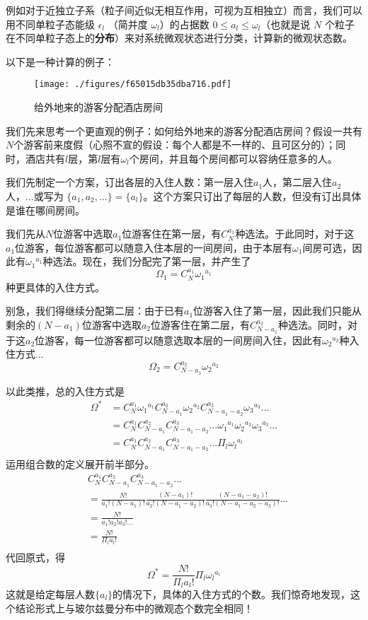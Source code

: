 例如对于近独立子系（粒子间近似无相互作用，可视为互相独立）而言，我们可以用不同单粒子态能级 $\epsilon_l$ （简并度 $\omega_l$）的占据数 $0\le a_l\le \omega_l$（也就是说 $N$ 个粒子在不同单粒子态上的\textbf{分布}）来对系统微观状态进行分类，计算新的微观状态数。

以下是一种计算的例子：
\begin{example}{}
\begin{figure}[ht]
\centering
\texttt{[image: ./figures/f65015db35dba716.pdf]}
\caption{给外地来的游客分配酒店房间} \label{fig_entro2_1}
\end{figure}
我们先来思考一个更直观的例子：如何给外地来的游客分配酒店房间？假设一共有$N$个游客前来度假（心照不宣的假设：每个人都是不一样的、且可区分的）；同时，酒店共有$l$层，第$l$层有$\omega_l$个房间，并且每个房间都可以容纳任意多的人。

我们先制定一个方案，订出各层的入住人数：第一层入住$a_1$人，第二层入住$a_2$人，...或写为 $\{a_1,a_2,...\}=\{a_l\}$。这个方案只订出了每层的人数，但没有订出具体是谁在哪间房间。

我们先从$N$位游客中选取$a_1$位游客住在第一层，有$C_N^{a_1}$种选法。于此同时，对于这$a_1$位游客，每位游客都可以随意入住本层的一间房间，由于本层有$\omega_1$间房可选，因此有${\omega_1}^{a_1}$种选法。现在，我们分配完了第一层，并产生了$$\Omega_1 = C_N^{a_1} {\omega_1}^{a_1}$$种更具体的入住方式。

别急，我们得继续分配第二层：由于已有$a_1$位游客入住了第一层，因此我们只能从剩余的$(N-a_1)$位游客中选取$a_2$位游客住在第二层，有$C_{N-a_1}^{a_2}$种选法。同时，对于这$a_2$位游客，每一位游客都可以随意选取本层的一间房间入住，因此有${\omega_2}^{a_2}$种入住方式...
$$\Omega_2 = C_{N-a_1}^{a_2} {\omega_2}^{a_2}$$

以此类推，总的入住方式是
$$
\begin{aligned}
\Omega^* &= C_N^{a_1} {\omega_1}^{a_1} C_{N-a_1}^{a_2} {\omega_2}^{a_2} C_{N-a_1-a_2}^{a_3} {\omega_3}^{a_3}...\\
&=C_N^{a_1} C_{N-a_1}^{a_2} C_{N-a_1-a_2}^{a_3} ... {\omega_1}^{a_1}{\omega_2}^{a_2}  {\omega_3}^{a_3}...\\
& = C_N^{a_1} C_{N-a_1}^{a_2} C_{N-a_1-a_2}^{a_3} ... \Pi_l{\omega_l}^{a_l}\\
\end{aligned}
$$
运用组合数的定义展开前半部分。
$$
\begin{aligned}
& C_N^{a_1} C_{N-a_1}^{a_2} C_{N-a_1-a_2}^{a_3} ...\\
&= \frac{N!}{a_1!(N-a_1)!} 
\frac{(N-a_1)!}{a_2!(N-a_1-a_2)!}
\frac{(N-a_1-a_2)!}{a_3!(N-a_1-a_2-a_3)!}
...\\
&=\frac{N!}{a_1!a_2!a_3!...} \\
&=\frac{N!}{\Pi_l a_l!} \\
\end{aligned}
$$
代回原式，得
$$
\Omega^* = \frac{N!}{\Pi_l a_l!}  \Pi_l{\omega_l}^{a_l}
$$
这就是给定每层人数$\{a_l\}$的情况下，具体的入住方式的个数。我们惊奇地发现，这个结论形式上与玻尔兹曼分布中的微观态个数完全相同！


\end{example}
